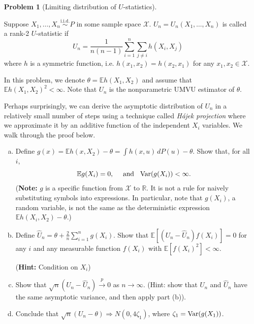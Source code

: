 \documentclass{article}
\newcommand{\cX}{\mathcal{X}}
\newcommand{\EE}{\mathbb{E}}
\newcommand{\RR}{\mathbb{R}}
\newcommand{\Var}{\textnormal{Var}}
\newcommand{\toProb}{\overset{p}{\to}}
\newcommand{\simiid}{\overset{\text{i.i.d.}}{\sim}}
\theoremstyle{definition}
\newtheorem{problem}{Problem}
\begin{document}
\begin{problem}[Limiting distribution of $U$-statistics]
\label{prob:u-statistics}

Suppose $X_{1}, \ldots, X_{n} \simiid P$ in some sample space $\cX$. $U_{n} = U_{n}(X_{1}, \ldots, X_{n})$ is called a rank-2 $U$-statistic if
\[U_{n} = \frac{1}{n(n - 1)}\sum_{i=1}^{n}\sum_{j\neq i}h(X_{i}, X_{j})\]
where $h$ is a symmetric function, i.e. $h(x_{1}, x_{2}) = h(x_{2}, x_{1})$ for any $x_{1}, x_{2}\in\cX$.

In this problem, we denote $\theta = \EE h(X_{1}, X_{2})$ and assume that $\EE h(X_{1}, X_{2})^{2} < \infty$. Note that $U_n$ is the nonparametric UMVU estimator of $\theta$.

Perhaps surprisingly, we can derive the asymptotic distribution of $U_n$ in a relatively small number of steps using a technique called {\em H\'{a}jek projection} where we approximate it by an additive function of the independent $X_i$ variables. We walk through the proof below.

\begin{enumerate}[(a)]
\item Define $g(x) = \EE h(x, X_2) - \theta = \int h(x,u)\,d P(u) - \theta$. Show that, for all $i$,
\[
\EE g(X_i) = 0, \quad \text{ and } \;\;\Var(g(X_i)) < \infty.
\]
({\bf Note:} $g$ is a specific function from $\cX$ to $\RR$. It is not a rule for naively substituting symbols into expressions. In particular, note that $g(X_i)$, a random variable, is not the same as the deterministic expression $\EE h(X_i, X_2)-\theta$.)




\item Define $\widehat{U}_{n} = \theta + \frac{2}{n}\sum_{i=1}^{n}g(X_{i})$. Show that $\EE[(U_n-\widehat{U}_n)f(X_i)]=0$ for any $i$ and any measurable function $f(X_i)$ with $\EE[f(X_i)^2] < \infty$.

({\bf Hint:} Condition on $X_i$)



\item Show that ${\sqrt{n}(U_{n} - \widehat{U}_{n})\toProb 0}$ as $n\to\infty$. (Hint: show that $U_n$ and $\widehat{U}_n$ have the same asymptotic variance, and then apply part (b)).

  



\item Conclude that $\sqrt{n}(U_{n} - \theta)\Rightarrow N(0, 4\zeta_{1})$, where $\zeta_{1} = \Var(g(X_{1}))$.





\end{enumerate}
\end{problem}
\end{document}
